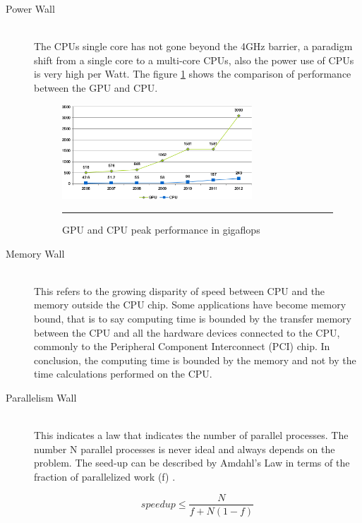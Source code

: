 \begin{description}
  \item[Power Wall] \hfill \\
  The CPUs single core has not gone beyond the 4GHz barrier, a paradigm shift from a single core to a multi-core CPUs, also  the power use of CPUs is very high per Watt. The figure \ref{fig:gpu_cpu_s} shows the comparison of performance between the GPU and CPU.

\begin{figure}[htbp]
	\centering
		\includegraphics[width=0.70\textwidth]{Figures/GPU_CPU_s.png}
		\rule{35em}{0.5pt}
	\caption[GPU and CPU]{GPU and CPU peak performance in gigaflops}
	\label{fig:gpu_cpu_s}
\end{figure}


  \item[Memory Wall] \hfill \\
  This refers to the growing disparity of speed between CPU  and the memory outside the CPU chip. Some applications have become memory bound, that is to say computing time is bounded by the transfer memory between the CPU and all the hardware devices connected to the CPU, commonly to the Peripheral Component Interconnect (PCI) chip. In conclusion, the computing time is bounded by the memory and not by the time calculations performed on the CPU.

  \item[Parallelism Wall] \hfill \\
  This indicates a law that indicates the number of parallel processes. The number N parallel processes is never ideal and always depends on the problem.  The seed-up can be described by Amdahl's Law in terms of the fraction of parallelized work (f) \cite{quantitative}.

  $$speedup \leq \frac{N}{f + N(1-f)}$$


\end{description}

